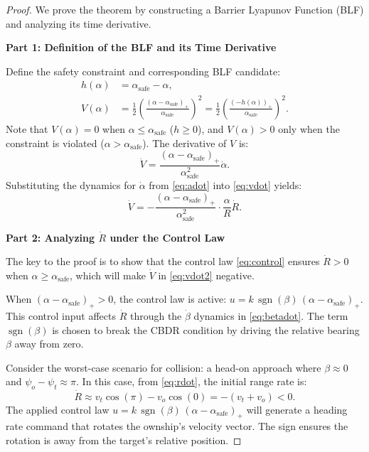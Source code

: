\documentclass[10pt]{article}
\DeclareMathOperator{\sgn}{sgn}
\begin{document}
\begin{proof}
    We prove the theorem by constructing a Barrier Lyapunov Function (BLF) and analyzing its time derivative.

    \textbf{Part 1: Definition of the BLF and its Time Derivative}

    Define the safety constraint and corresponding BLF candidate:
    \begin{align}
        h(\alpha) &= \alpha_{\text{safe}} - \alpha, \label{eq:hdef} \\
        V(\alpha) &= \frac{1}{2} \left( \frac{(\alpha - \alpha_{\text{safe}})_+}{\alpha_{\text{safe}}} \right)^2 = \frac{1}{2} \left( \frac{(-h(\alpha))_+}{\alpha_{\text{safe}}} \right)^2. \label{eq:vdef}
    \end{align}
    Note that $V(\alpha) = 0$ when $\alpha \leq \alpha_{\text{safe}}$ ($h \geq 0$), and $V(\alpha) > 0$ only when the constraint is violated ($\alpha > \alpha_{\text{safe}}$). The derivative of $V$ is:
    \begin{equation}\label{eq:vdot}
        \dot{V} = \frac{(\alpha - \alpha_{\text{safe}})_+}{\alpha_{\text{safe}}^2} \dot{\alpha}.
    \end{equation}
    Substituting the dynamics for $\dot{\alpha}$ from \eqref{eq:adot} into \eqref{eq:vdot} yields:
    \begin{equation}\label{eq:vdot2}
        \dot{V} = -\frac{(\alpha - \alpha_{\text{safe}})_+}{\alpha_{\text{safe}}^2} \cdot \frac{\alpha}{R} \dot{R}.
    \end{equation}

    \textbf{Part 2: Analyzing $\dot{R}$ under the Control Law}

    The key to the proof is to show that the control law \eqref{eq:control} ensures $\dot{R} > 0$ when $\alpha \geq \alpha_{\text{safe}}$, which will make $\dot{V}$ in \eqref{eq:vdot2} negative.

    When $(\alpha - \alpha_{\text{safe}})_+ > 0$, the control law is active: $u = k \, \sgn(\beta) \, (\alpha - \alpha_{\text{safe}})_+$. This control input affects $\dot{R}$ through the $\dot{\beta}$ dynamics in \eqref{eq:betadot}. The term $\sgn(\beta)$ is chosen to break the CBDR condition by driving the relative bearing $\beta$ away from zero.

    Consider the worst-case scenario for collision: a head-on approach where $\beta \approx 0$ and $\psi_o - \psi_t \approx \pi$. In this case, from \eqref{eq:rdot}, the initial range rate is:
    \begin{equation*}
        \dot{R} \approx v_t \cos(\pi) - v_o \cos(0) = -(v_t + v_o) < 0.
    \end{equation*}
    The applied control law $u = k \, \sgn(\beta) \, (\alpha - \alpha_{\text{safe}})_+$ will generate a heading rate command that rotates the ownship's velocity vector. The sign ensures the rotation is away from the target's relative position.


\end{proof}
\end{document}
